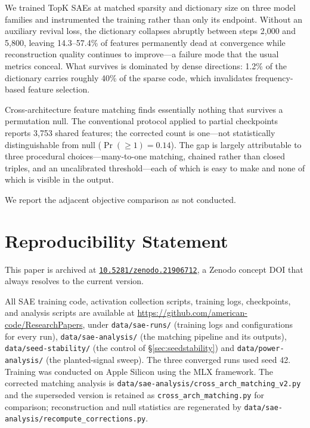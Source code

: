 \documentclass[11pt]{article}
\begin{document}
We trained TopK SAEs at matched sparsity and dictionary size on three model families and
instrumented the training rather than only its endpoint. Without an auxiliary revival
loss, the dictionary collapses abruptly between steps 2{,}000 and 5{,}800,
leaving 14.3--57.4\% of features permanently dead at convergence while reconstruction quality continues to
improve---a failure mode that the usual metrics conceal. What survives is dominated by dense directions:
1.2\% of the dictionary carries roughly 40\% of the sparse code, which invalidates
frequency-based feature selection.

Cross-architecture feature matching finds essentially nothing that survives a permutation null. The
conventional protocol applied to partial checkpoints reports 3{,}753 shared features;
the corrected count is one---not statistically distinguishable from null ($\Pr(\geq 1) = 0.14$). The gap is largely attributable to three procedural
choices---many-to-one matching, chained rather than closed triples, and an uncalibrated
threshold---each of which is easy to make and none of which is visible in the output.

We report the adjacent objective comparison as not conducted.

\section*{Reproducibility Statement}

This paper is archived at \href{https://doi.org/10.5281/zenodo.21906712}{\texttt{10.5281/zenodo.21906712}}, a Zenodo concept DOI that always resolves to the current version.

All SAE training code, activation collection scripts, training logs, checkpoints, and
analysis scripts are available at
\url{https://github.com/american-code/ResearchPapers}, under \texttt{data/sae-runs/}
(training logs and configurations for every run), \texttt{data/sae-analysis/}
(the matching pipeline and its outputs), \texttt{data/seed-stability/} (the control
of \S\ref{sec:seedstability}) and \texttt{data/power-analysis/} (the planted-signal
sweep). The three converged runs used seed 42.
Training was conducted on Apple Silicon using the MLX framework. The corrected matching
analysis is \texttt{data/sae-analysis/cross\_arch\_matching\_v2.py} and the superseded
version is retained as \texttt{cross\_arch\_matching.py} for comparison; reconstruction
and null statistics are regenerated by
\texttt{data/sae-analysis/recompute\_corrections.py}.
\end{document}
